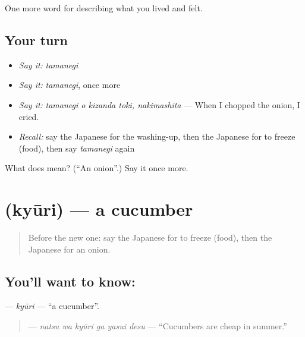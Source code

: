 \begin{grammarlens}[title={What you've built}]
One more word for describing what you lived and felt.
\end{grammarlens}

\subsection*{Your turn}
\begin{itemize}
\raggedright
  \item \emph{Say it:} \emph{tamanegi}
  \item \emph{Say it:} \emph{tamanegi}, once more
  \item \emph{Say it:} \emph{tamanegi o kizanda toki, nakimashita} — When I chopped the onion, I cried.
  \item \emph{Recall:} say the Japanese for the washing-up, then the Japanese for to freeze (food), then say \emph{tamanegi} again
\end{itemize}

\begin{tcolorbox}[breakable,colback=teal!4,colframe=teal!35!black,title={Before you move on}]
What does  mean? (\textquotedblleft{}An onion\textquotedblright{}.) Say it once more.
\end{tcolorbox}
\section[\texorpdfstring{\ja{きゅうり} (kyūri)}{きゅうり (kyūri)}]{ (kyūri) — a cucumber}

\label{lesson:JA-C494-kyuuri}



\begin{quote}
Before the new one: say the Japanese for to freeze (food), then the Japanese for an onion.
\end{quote}

\subsection*{You'll want to know: }
\textbf{} — \emph{kyūri} — \textquotedblleft{}a cucumber\textquotedblright{}.

\begin{quote}
\textbf{  } — \emph{natsu wa kyūri ga yasui desu} — \textquotedblleft{}Cucumbers are cheap in summer.\textquotedblright{}
\end{quote}

